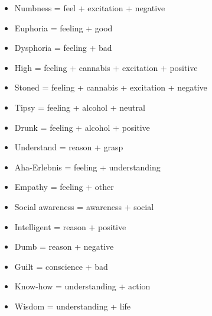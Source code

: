 \begin{multicols}{2}
\begin{itemize}
\item   Numbness = feel + excitation + negative 

\item   Euphoria = feeling + good 

\item   Dysphoria = feeling + bad 

\item   High = feeling + cannabis + excitation + positive 

\item   Stoned = feeling + cannabis + excitation + negative 

\item   Tipsy = feeling + alcohol + neutral 

\item   Drunk = feeling + alcohol + positive 

\item   Understand = reason + grasp 

\item   Aha-Erlebnis = feeling + understanding 

\item   Empathy = feeling + other 

\item   Social awareness = awareness + social 

\item   Intelligent = reason + positive 

\item   Dumb = reason + negative 

\item   Guilt = conscience + bad 

\item   Know-how = understanding + action 

\item   Wisdom = understanding + life 
\end{itemize}
\end{multicols}

